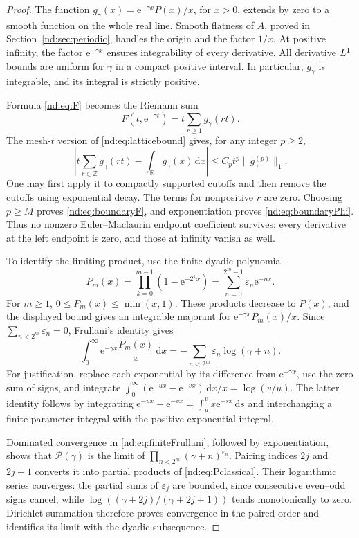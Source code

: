 \documentclass[11pt,a4paper,oneside,openany]{book}
\numberwithin{equation}{chapter}
\theoremstyle{definition}
\theoremstyle{remark}
\newcommand{\eps}{\varepsilon}
\newcommand{\ZZ}{\mathbb Z}
\newcommand{\RR}{\mathbb R}
\newcommand{\dd}{\,\mathrm d}
\newcommand{\e}{\mathrm e}
\newcommand{\Lsad}{\mathsf L}
\begin{document}
\begin{proof}
The function
\(g_\gamma(x)=\e^{-\gamma x}P(x)/x\), for \(x>0\), extends by zero to a
smooth function on the whole real line. Smooth flatness of \(A\), proved in
Section~\ref{nd:sec:periodic}, handles the origin and the factor \(1/x\).
At positive infinity, the factor \(\e^{-\gamma x}\) ensures integrability
of every derivative. All derivative \(\mathrm \Lsad^1\) bounds are uniform for \(\gamma\)
in a compact positive interval. In particular, \(g_\gamma\) is integrable,
and its integral is strictly positive.

Formula \eqref{nd:eq:F} becomes the Riemann sum
\begin{equation}
 F(t,\e^{-\gamma t})=t\sum_{r\ge1}g_\gamma(rt).
 \label{nd:eq:riemannboundary}
\end{equation}
The mesh-\(t\) version of \eqref{nd:eq:latticebound} gives, for any integer
\(p\ge2\),
\[
 \left|t\sum_{r\in\ZZ}g_\gamma(rt)-\int_\RR g_\gamma(x)\dd x\right|
 \le C_p t^p\|g_\gamma^{(p)}\|_1.
\]
One may first apply it to compactly supported cutoffs and then remove the
cutoffs using exponential decay. The terms for nonpositive \(r\) are zero.
Choosing \(p\ge M\) proves \eqref{nd:eq:boundaryF}, and exponentiation proves
\eqref{nd:eq:boundaryPhi}. Thus no nonzero Euler--Maclaurin endpoint coefficient
survives: every derivative at the left endpoint is zero, and those at infinity
vanish as well.

To identify the limiting product, use the finite dyadic polynomial
\[
 P_m(x)=\prod_{k=0}^{m-1}(1-\e^{-2^kx})
       =\sum_{n=0}^{2^m-1}\eps_n\e^{-nx}.
\]
For \(m\ge1\), \(0\le P_m(x)\le\min(x,1)\). These products decrease to
\(P(x)\), and the displayed bound gives an integrable majorant for
\(\e^{-\gamma x}P_m(x)/x\). Since \(\sum_{n<2^m}\eps_n=0\), Frullani's
identity gives
\begin{equation}
 \int_0^\infty\e^{-\gamma x}\frac{P_m(x)}x\dd x
       =-\sum_{n<2^m}\eps_n\log(\gamma+n).
 \label{nd:eq:finiteFrullani}
\end{equation}
For justification, replace each exponential by its difference from
\(\e^{-\gamma x}\), use the zero sum of signs, and integrate
\(\int_0^\infty(\e^{-ux}-\e^{-vx})\dd x/x=\log(v/u)\).
The latter identity follows by integrating
\(\e^{-ux}-\e^{-vx}=\int_u^v x\e^{-sx}\dd s\) and interchanging a finite
parameter integral with the positive exponential integral.

Dominated convergence in \eqref{nd:eq:finiteFrullani}, followed by exponentiation,
shows that \(\mathcal P(\gamma)\) is the limit of
\(\prod_{n<2^m}(\gamma+n)^{\eps_n}\). Pairing indices \(2j\) and \(2j+1\)
converts it into partial products of \eqref{nd:eq:Pclassical}. Their logarithmic
series converges: the partial sums of \(\eps_j\) are bounded, since consecutive even--odd
signs cancel, while
\(\log((\gamma+2j)/(\gamma+2j+1))\) tends monotonically to zero.
Dirichlet summation therefore proves convergence in the paired order and
identifies its limit with the dyadic subsequence.
\end{proof}
\end{document}
